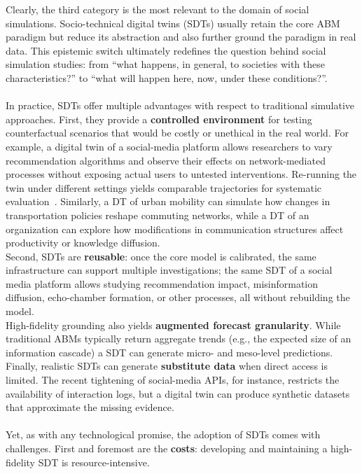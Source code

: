 \documentclass[11pt]{article}
\begin{document}
\noindent Clearly, the third category is the most relevant to the domain of social simulations. 
Socio-technical digital twins (SDTs) usually retain the core ABM paradigm but reduce its abstraction and also further ground the paradigm in real data.
This epistemic switch ultimately redefines the question behind social simulation studies: from ``what happens, in general, to societies with these characteristics?'' to ``what will happen here, now, under these conditions?''.
\\ \ \\
In practice, SDTs offer multiple advantages with respect to traditional simulative approaches.
First, they provide a \textbf{controlled environment} for testing counterfactual scenarios that would be costly or unethical in the real world. 
For example, a digital twin of a social-media platform allows researchers to vary recommendation algorithms and observe their effects on network-mediated processes without exposing actual users to untested interventions. 
Re-running the twin under different settings yields comparable trajectories for systematic evaluation~\cite{rossetti2024social}.
Similarly, a DT of urban mobility can simulate how changes in transportation policies reshape commuting networks, while a DT of an organization can explore how modifications in communication structures affect productivity or knowledge diffusion.
\\
Second, SDTs are \textbf{reusable}: once the core model is calibrated, the same infrastructure can support multiple investigations; the same SDT of a social media platform allows studying recommendation impact, misinformation diffusion, echo-chamber formation, or other processes, all without rebuilding the model.\\
High-fidelity grounding also yields \textbf{augmented forecast granularity}.
While traditional ABMs typically return aggregate trends (e.g., the expected size of an information cascade) a SDT can generate micro- and meso-level predictions. 
\\
Finally, realistic SDTs can generate \textbf{substitute data} when direct access is limited. 
The recent tightening of social-media APIs, for instance, restricts the availability of interaction logs, but a digital twin can produce synthetic datasets that approximate the missing evidence. 
\\ \ \\
Yet, as with any technological promise, the adoption of SDTs comes with challenges.
First and foremost are the \textbf{costs}: developing and maintaining a high-fidelity SDT is resource-intensive.
\end{document}
